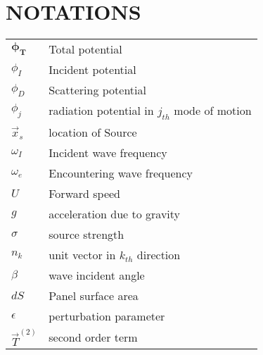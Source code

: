 \chapter*{\centering NOTATIONS}
\vspace{0.5cm}
\begin{table}[h]
\centering
\setlength{\tabcolsep}{12pt}
\renewcommand{\arraystretch}{1.5} %
\begin{tabular}{ll}
    $\boldsymbol{\phi_T}$   &    Total potential \\
    $\phi_I$ & Incident potential \\
    $\phi_D$ & Scattering potential \\
    $\phi_j$ & radiation potential in $j_{th}$ mode of motion \\
    $\vec{x}_s$ & location of Source \\
    $\omega_I$ & Incident wave frequency \\
    $\omega_e$ & Encountering wave frequency \\
    $U$ & Forward speed \\
    $g$ & acceleration due to gravity \\
    $\sigma$ & source strength \\
    $n_k$ & unit vector in $k_{th}$ direction \\
    $\beta$ & wave incident angle \\
    $dS$  & Panel surface area \\
    $\epsilon$ & perturbation parameter \\
    $\vec{T}^{(2)}$ & second order term
\end{tabular}
\end{table}
